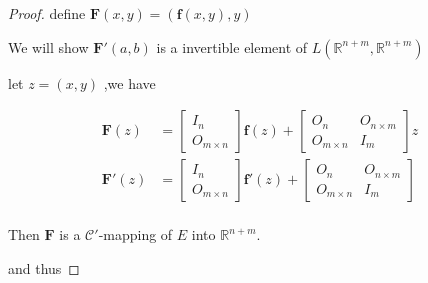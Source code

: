\begin{proof}
    define $\mathbf{F}(x,y) = \left( \mathbf{f}(x,y), y \right)$

     
    We will show $\mathbf{F}'(a,b)$ is a invertible element of $L(\mathbb{R}^{n+m},\mathbb{R}^{n+m})$ 

    let $z = (x,y)$ ,we have

   \begin{align*}
        \mathbf{F}(z) &= \begin{bmatrix}
           I_n \\ 
           O_{m \times n}
        \end{bmatrix} \mathbf{f}(z) + \begin{bmatrix}
           O_n & O_{n \times m} \\
           O_{m \times n} & I_m
       \end{bmatrix} z \\
        \mathbf{F}'(z) &= \begin{bmatrix}
           I_n \\ 
           O_{m \times n}
        \end{bmatrix} \mathbf{f}'(z) + \begin{bmatrix}
           O_n & O_{n \times m} \\
           O_{m \times n} & I_m
        \end{bmatrix}  \\
   \end{align*}

Then $\mathbf{F}$ is a $\mathscr{C}'$-mapping of $E$ into $\mathbb{R}^{n+m}$.

    and thus


\end{proof}
